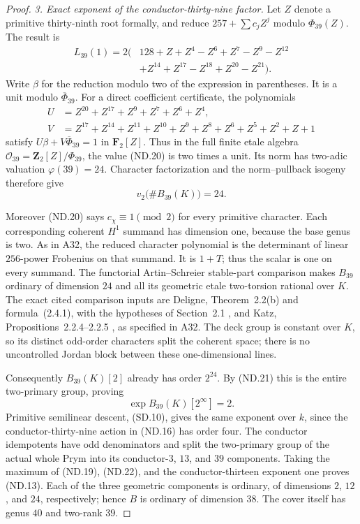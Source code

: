 \documentclass[11pt,a4paper]{article}
\begin{document}
\begin{proof}
\emph{3. Exact exponent of the conductor-thirty-nine factor.}
Let $Z$ denote a primitive thirty-ninth root formally, and
reduce $257+\sum c_jZ^j$ modulo $\Phi_{39}(Z)$. The result is
\[
\begin{aligned}
 L_{39}(1)=2\bigl(&128+Z+Z^4-Z^6+Z^7-Z^9-Z^{12}\\
                &+Z^{14}+Z^{17}-Z^{18}+Z^{20}-Z^{21}\bigr).
\end{aligned}
 \tag{ND.20}
\]
Write $\beta$ for the reduction modulo two of the expression
in parentheses. It is a unit modulo $\overline\Phi_{39}$.
For a direct coefficient certificate, the polynomials
\[
\begin{aligned}
 U&=Z^{20}+Z^{17}+Z^9+Z^7+Z^6+Z^4,\\
 V&=Z^{17}+Z^{14}+Z^{11}+Z^{10}+Z^9+Z^8
                         +Z^6+Z^5+Z^2+Z+1
\end{aligned}
\]
satisfy $U\beta+V\overline\Phi_{39}=1$ in $\mathbf F_2[Z]$.
Thus in the full finite etale algebra
$\mathcal O_{39}=\mathbf Z_2[Z]/\Phi_{39}$, the value (ND.20)
is two times a unit. Its norm has two-adic valuation
$\varphi(39)=24$. Character factorization and the norm--pullback
isogeny therefore give
\[
                       v_2\bigl(\#B_{39}(K)\bigr)=24.
 \tag{ND.21}
\]

Moreover (ND.20) says $c_\chi\equiv1\pmod2$ for every
primitive character. Each corresponding coherent $H^1$
summand has dimension one, because the base genus is two.
As in A32, the reduced character polynomial is the determinant
of linear $256$-power Frobenius on that summand. It is $1+T$;
thus the scalar is one on every summand. The functorial
Artin--Schreier stable-part comparison makes $B_{39}$ ordinary
of dimension $24$ and all its geometric etale two-torsion
rational over $K$. The exact cited comparison inputs are
Deligne, Theorem~2.2(b) and formula~(2.4.1), with the hypotheses
of Section~2.1 \cite{DeligneModP}, and Katz,
Propositions~2.2.4--2.2.5 \cite{KatzCongruence}, as specified
in A32. The deck group is constant over $K$, so its distinct
odd-order characters split the coherent space; there is no
uncontrolled Jordan block between these one-dimensional lines.

Consequently $B_{39}(K)[2]$ already has order $2^{24}$.
By (ND.21) this is the entire two-primary group, proving
\[
                        \exp B_{39}(K)[2^\infty]=2.
 \tag{ND.22}
\]
Primitive semilinear descent, (SD.10), gives the same exponent
over $k$, since the conductor-thirty-nine action in (ND.16)
has order four. The conductor idempotents have odd denominators
and split the two-primary group of the actual whole Prym into
its conductor-$3$, $13$, and $39$ components. Taking the maximum
of (ND.19), (ND.22), and the conductor-thirteen exponent one
proves (ND.13). Each of the three geometric components is
ordinary, of dimensions $2$, $12$, and $24$, respectively;
hence $B$ is ordinary of dimension $38$. The cover itself has
genus $40$ and two-rank $39$.


\end{proof}
\end{document}

